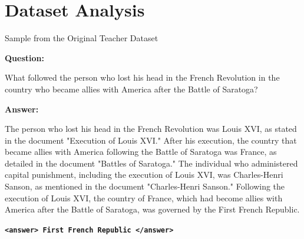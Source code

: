 \section{Dataset Analysis}

\begin{frame}{Sample from the Original Teacher Dataset}

\small

\textbf{Question:}

What followed the person who lost his head in the French Revolution
in the country who became allies with America after the Battle of Saratoga?

\vspace{0.2cm}

\textbf{Answer:}

The person who lost his head in the French Revolution was Louis XVI,
as stated in the document "Execution of Louis XVI." After his execution,
the country that became allies with America following the Battle of
Saratoga was France, as detailed in the document "Battles of Saratoga."
The individual who administered capital punishment, including the
execution of Louis XVI, was Charles-Henri Sanson, as mentioned in the
document "Charles-Henri Sanson." Following the execution of Louis XVI,
the country of France, which had become allies with America after the
Battle of Saratoga, was governed by the First French Republic.

\vspace{0.1cm}

\begin{center}
\textbf{\texttt{<answer> First French Republic </answer>}}
\end{center}

\end{frame}

